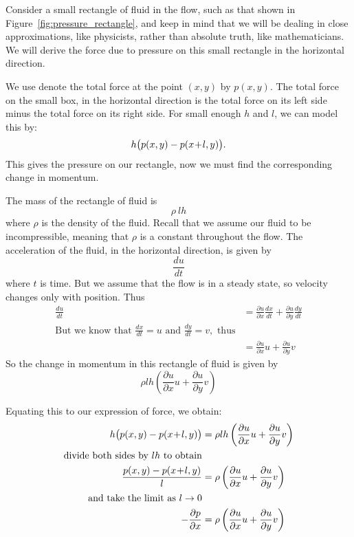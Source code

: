 \documentclass[letterpaper, twoside, 12 pt]{article}
\begin{document}
	Consider a small rectangle of fluid in the flow, such as that shown in Figure~\ref{fig:pressure_rectangle}, and keep in mind that we will be dealing in close approximations, like physicists, rather than absolute truth, like mathematicians.
	We will derive the force due to pressure on this small rectangle in the horizontal direction.
	
	We use denote the total force at the point $(x, y)$ by $p(x, y)$.
	The total force on the small box, in the horizontal direction is the total force on its left side minus the total force on its right side.
	For small enough $h$ and $l$, we can model this by:
	\[
		h \big( p(x, y) - p(x \!+\! l, y) \big).
	\]
	This gives the pressure on our rectangle, now we must find the corresponding change in momentum.

	The mass of the rectangle of fluid is
	\[
		\rho \> lh
	\]
	where $\rho$ is the density of the fluid.
	Recall that we assume our fluid to be incompressible, meaning that $\rho$ is a constant throughout the flow.
	The acceleration of the fluid, in the horizontal direction, is given by 
	\[
		\frac{du}{dt}
	\]
	where $t$ is time.
	But we assume that the flow is in a steady state, so velocity changes only with position.
	Thus
	\begin{align*}
	\frac{du}{dt} &= \frac{\partial u}{\partial x} \frac{dx}{dt} + \frac{\partial u}{\partial y} \frac{dy}{dt} \\
	\text{But we know that } \frac{dx}{dt} = u \text{ and } \frac{dy}{dt} = v, \text{ thus}\\
	&= \frac{\partial u}{\partial x} u + \frac{\partial u}{\partial y} v
	\end{align*}
	So the change in momentum in this rectangle of fluid is given by
	\[
		\rho lh \left( \frac{\partial u}{\partial x} u + \frac{\partial u}{\partial y} v \right)
	\]

	Equating this to our expression of force, we obtain:
	\begin{align*}
		h \big( p(x, y) - p(x \!+\! l, y) \big) &= \rho lh \left( \frac{\partial u}{\partial x} u + \frac{\partial u}{\partial y} v \right)\\
		\text{divide both sides by $lh$ to obtain}\\
		\frac{p(x, y) - p(x \!+\! l, y)}{l} &= \rho \left( \frac{\partial u}{\partial x} u + \frac{\partial u}{\partial y} v \right) \\
		\text{and take the limit as $l \to 0$}\\
		- \frac{\partial p}{\partial x} &= \rho \left( \frac{\partial u}{\partial x} u + \frac{\partial u}{\partial y} v \right)
	\end{align*}
	
\end{document}
